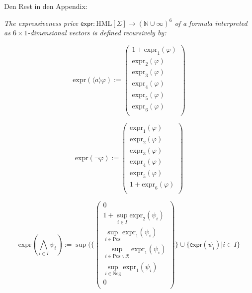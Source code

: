 %
\begin{isabellebody}%
%
%
\isadelimtheory
%
\endisadelimtheory
%
\isatagtheory
%
\endisatagtheory
{\isafoldtheory}%
%
\isadelimtheory
%
\endisadelimtheory
%
\isadelimdocument
%
\endisadelimdocument
%
\isatagdocument
%
\isamarkuptrue%
%
\endisatagdocument
{\isafolddocument}%
%
\isadelimdocument
%
\endisadelimdocument
%
\begin{isamarkuptext}%
\label{chap:alternative_price_function}%
\end{isamarkuptext}\isamarkuptrue%
%
\begin{isamarkuptext}%
Den Rest in den Appendix:%
\end{isamarkuptext}\isamarkuptrue%
%
\begin{isamarkuptext}%
\textit{
The expressiveness price $\textsf{expr} : \text{HML}[\Sigma] \rightarrow (\mathbb{N \cup \infty})^6$ of a formula interpreted as $6 \times 1$-dimensional vectors is defined recursively by:}

\begin{minipage}{0.45\textwidth}
\[
\text{expr}(\langle a \rangle \varphi) :=
\begin{pmatrix}
1 + \text{expr}_1(\varphi) \\
\text{expr}_2(\varphi) \\
\text{expr}_3(\varphi) \\
\text{expr}_4(\varphi) \\
\text{expr}_5(\varphi) \\
\text{expr}_6(\varphi) \\
\end{pmatrix}
\]
\end{minipage}
\hfill
\begin{minipage}{0.45\textwidth}
\[
\text{expr}(\neg \varphi) := 
\begin{pmatrix}
\text{expr}_1(\varphi) \\
\text{expr}_2(\varphi) \\
\text{expr}_3(\varphi) \\
\text{expr}_4(\varphi) \\
\text{expr}_5(\varphi) \\
1 + \text{expr}_6(\varphi) \\
\end{pmatrix}
\]
\end{minipage}

\[
\text{expr}\left( \bigwedge_{i \in I} \psi_i \right) := \sup(\{
\begin{pmatrix}
0 \\
1 + \sup_{i \in I} \text{expr}_2(\psi_i) \\
\sup_{i \in \text{Pos}} \text{expr}_1(\psi_i) \\
\sup_{i \in \text{Pos} \backslash \mathcal{R}} \text{expr}_1(\psi_i) \\
\sup_{i \in \text{Neg}} \text{expr}_1(\psi_i) \\
0 \\
\end{pmatrix} \} \cup \{\textsf{expr}(\psi_i) | i \in I\} 
\]


\end{isamarkuptext}
\end{isabellebody}
